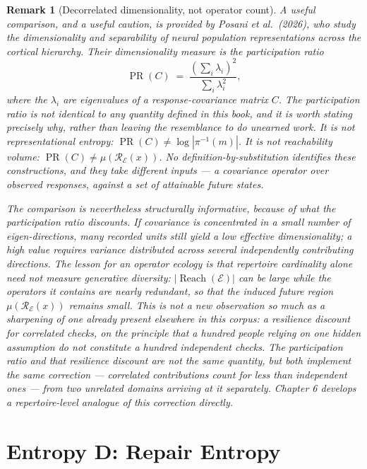 \documentclass[12pt]{report}
\newtheorem{remark}[definition]{Remark}
\newcommand{\Reach}{\ensuremath{\operatorname{Reach}}}
\begin{document}
\begin{remark}[Decorrelated dimensionality, not operator count]
\label{rem:posani-participation}
A useful comparison, and a useful caution, is provided by Posani et al.\
(2026), who study the dimensionality and separability of neural
population representations across the cortical hierarchy. Their
dimensionality measure is the participation ratio
\[
\operatorname{PR}(C) \;=\; \frac{\left(\sum_i \lambda_i\right)^2}{\sum_i \lambda_i^2},
\]
where the $\lambda_i$ are eigenvalues of a response-covariance matrix
$C$. The participation ratio is not identical to any quantity defined in
this book, and it is worth stating precisely why, rather than leaving
the resemblance to do unearned work. It is not representational entropy:
$\operatorname{PR}(C) \neq \log|\pi^{-1}(m)|$. It is not reachability
volume: $\operatorname{PR}(C) \neq \mu(\mathcal{R}_\mathcal{E}(x))$. No
definition-by-substitution identifies these constructions, and they take
different inputs --- a covariance operator over observed responses,
against a set of attainable future states.

The comparison is nevertheless structurally informative, because of what
the participation ratio discounts. If covariance is concentrated in a
small number of eigen-directions, many recorded units still yield a low
effective dimensionality; a high value requires variance distributed
across several independently contributing directions. The lesson for an
operator ecology is that repertoire cardinality alone need not measure
generative diversity: $|\Reach(\mathcal{E})|$ can be large while the
operators it contains are nearly redundant, so that the induced future
region $\mu(\mathcal{R}_\mathcal{E}(x))$ remains small. This is not a new
observation so much as a sharpening of one already present elsewhere in
this corpus: a resilience discount for correlated checks, on the
principle that a hundred people relying on one hidden assumption do not
constitute a hundred independent checks. The participation ratio and
that resilience discount are not the same quantity, but both implement
the same correction --- correlated contributions count for less than
independent ones --- from two unrelated domains arriving at it
separately. Chapter 6 develops a repertoire-level analogue of this
correction directly.
\end{remark}

\section{Entropy D: Repair Entropy}
\label{sec:repair-entropy}
\end{document}
